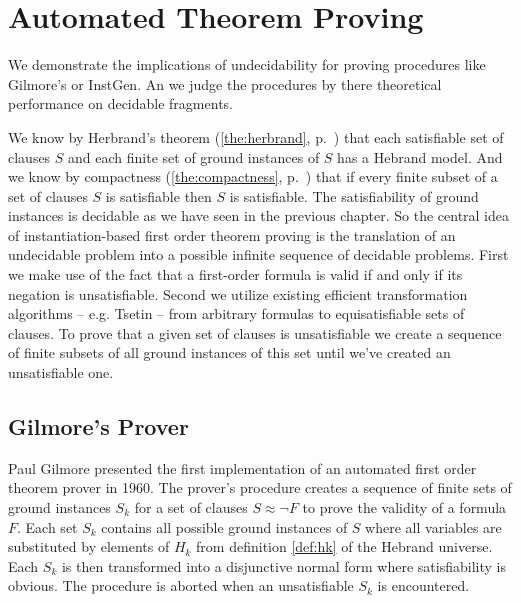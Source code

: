 
\chapter{Automated Theorem Proving}



We demonstrate the implications of undecidability for proving procedures like Gilmore's or InstGen.
An we judge the procedures by there theoretical performance on decidable fragments. 

We know by Herbrand's theorem (\ref{the:herbrand}, p.~\pageref{the:herbrand})
that each satisfiable set of clauses $S$
and each finite set of ground instances of $S$
has a Hebrand model. 
And we know by compactness (\ref{the:compactness}, p.~\pageref{the:compactness})
that if every finite subset of a set of clauses $S$ is satisfiable then $S$ is satisfiable.
The satisfiability of ground instances is decidable as we have seen in the previous chapter.
So the central idea of instantiation-based first order theorem proving is the
translation of an undecidable problem into a possible infinite sequence of decidable problems.
First we make use of the fact that a first-order formula is valid if and only if its negation is unsatisfiable.
Second we utilize existing efficient transformation algorithms -- e.g. Tsetin -- from arbitrary formulas to equisatisfiable sets of clauses. 
To prove that a given set of clauses is unsatisfiable we create a sequence of finite subsets of all ground instances of this set
until we've created an unsatisfiable one. 






\section{Gilmore's Prover}

Paul Gilmore presented the first implementation \cite{5392528} of an automated first order theorem prover in 1960.
%
The prover's procedure 
creates a sequence of finite sets of ground instances $S_k$ 
for a set of clauses $S\approx\lnot F$ to prove the validity of a formula $F$.
Each set $S_k$ contains all possible ground instances of $S$ 
where all variables are substituted by elements of $H_k$
from definition \ref{def:hk} of the Hebrand universe.
Each $S_k$ is then transformed into a disjunctive normal form where satisfiability is obvious.
The procedure is aborted when an unsatisfiable $S_k$ is encountered.

